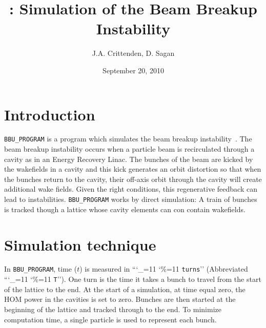 \documentclass[11pt]{article}
\title{ {\bbup}: Simulation of the Beam Breakup Instability}
\author{J.A. Crittenden, D. Sagan}
\date{September 20, 2010}
\newcommand{\bbup}{\texttt{BBU_PROGRAM}\xspace}
\newcommand\ttcmd{\begingroup\catcode`\_=11 \catcode`\%=11 \dottcmd}
\newcommand\dottcmd[1]{\texttt{#1}\endgroup}
\newcommand{\vn}{\ttcmd}
\begin{document}
\maketitle

\section{Introduction} 

\bbup is a program which simulates the beam breakup
instability~\cite{ref:Hoffstaetter04}. The beam breakup instability
occurs when a particle beam is recirculated through a cavity as in an
Energy Recovery Linac. The bunches of the beam are kicked by the
wakefields in a cavity and this kick generates an orbit distortion so
that when the bunches return to the cavity, their off-axis orbit
through the cavity will create additional wake fields. Given the right
conditions, this regenerative feedback can lead to instabilities.
\bbup works by direct simulation: A train of bunches is tracked though 
a lattice whose cavity elements can con contain wakefields.

\section{Simulation technique}

In \bbup, time ($t$) is measured in ``\vn{turns}'' (Abbreviated
``\vn{T}''). One turn is the time it takes a bunch to travel from the
start of the lattice to the end. At the start of a simulation, at time
equal zero, the HOM power in the cavities is set to zero. Bunches are
then started at the beginning of the lattice and tracked through to
the end. To minimize computation time, a single particle is used to
represent each bunch. 
\end{document}
